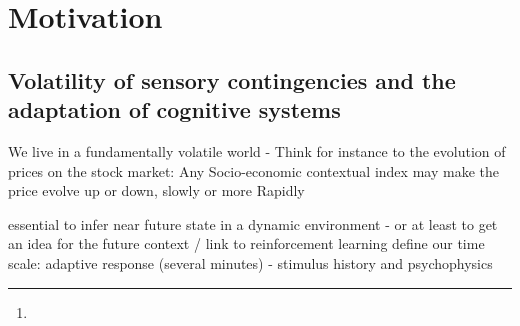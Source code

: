 \documentclass[profile,final,english, draft]{article}%
\title{\Title}%
\author{\AuthorA, 
\AuthorB,  
\AuthorC\thanks{\Address} }
\begin{document}
%
\maketitle%
\begin{abstract}
\Abstract
\end{abstract}
\section{Motivation}
\subsection{Volatility of sensory contingencies and the adaptation of cognitive systems}
 We live in a fundamentally volatile world - Think for instance to the evolution  of prices on the stock market: Any Socio-economic contextual index may make the price evolve up or down, slowly or more Rapidly 

 
 essential to infer near future state in a dynamic environment - or at least to get an idea for the future context / link to reinforcement learning
define our time scale: adaptive response (several minutes) - stimulus history and psychophysics
 
\end{document}
